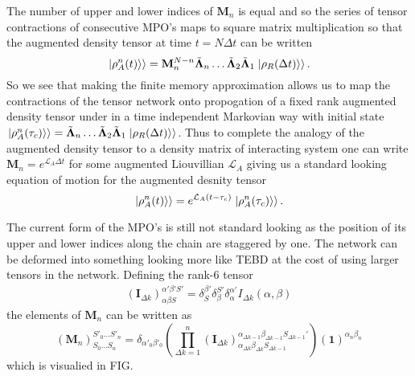\documentclass[a4paper, aps, pra,twocolumn]{revtex4-1}
\newcommand{\dket}[1]{\left.\Ket{#1}\right\rangle}
\begin{document}
The number of upper and lower indices of $\mathbf{M}_{n}$ is equal and so the series of tensor contractions of consecutive MPO's maps to square matrix multiplication so that the augmented density tensor at time $t=N \Delta t $ can be written
\begin{equation}
\dket{\rho^n_A( t)}=\mathbf{M}_{n}^{N-n}  \tilde{\mathbf{\Lambda}}_{n} \ldots \tilde{\mathbf{\Lambda}}_{2}\tilde{\mathbf{\Lambda}}_{1}\dket{\rho_R(\Delta t)}.
\end{equation}
So we see that making the finite memory approximation allows us to map the contractions of the tensor network onto propogation of a fixed rank augmented density tensor under in a time independent Markovian way with initial state $\dket{\rho^n_A( \tau_c)}=\tilde{\mathbf{\Lambda}}_{n} \ldots \tilde{\mathbf{\Lambda}}_{2}\tilde{\mathbf{\Lambda}}_{1}\dket{\rho_R(\Delta t)}$. Thus to complete the analogy of the augmented density tensor to a density matrix of interacting system one can write $\mathbf{M}_{n}=e^{\mathcal{L}_A \Delta t} $ for some augmented Liouvillian $\mathcal{L}_A$ giving us a standard looking equation of motion for the augmented desnity tensor
\begin{equation}
\dket{\rho^n_A( t)}=e^{\mathcal{L}_A (t-\tau_c)} \dket{\rho^n_A( \tau_c)}.
\end{equation}

The current form of the MPO's is still not standard looking as the position of its upper and lower indices along the chain are staggered by one. The network can be deformed into something looking more like TEBD at the cost of using larger tensors in the network. Defining the rank-6 tensor
\begin{align}\label{rank4}
(\mathbf{I}_{\Delta k})_{\alpha \beta S}^{\alpha' \beta' S'}= \delta^{\beta'}_S \delta_{\beta}^{S'}\delta_{\alpha}^{\alpha'} I_{\Delta k}(\alpha,\beta)
\end{align}
the elements of $\mathbf{M}_{n}$ can be written as
\begin{equation}
 (\mathbf{M}_{n})_{S_0 \ldots S_n}^{S'_0 \ldots S'_n}=\delta_{\alpha'_0 \beta'_0} \left(\prod_{\Delta k=1}^n (\mathbf{I}_{\Delta k})_{\alpha_{\Delta k} \beta_{\Delta k} S_{\Delta k-1}}^{\alpha_{\Delta k -1} \beta_{\Delta k -1} S_{\Delta k-1}'}\right ) (\mathbf{1})^{\alpha_n \beta_n}
\end{equation}
which is visualied in FIG.
\end{document}
